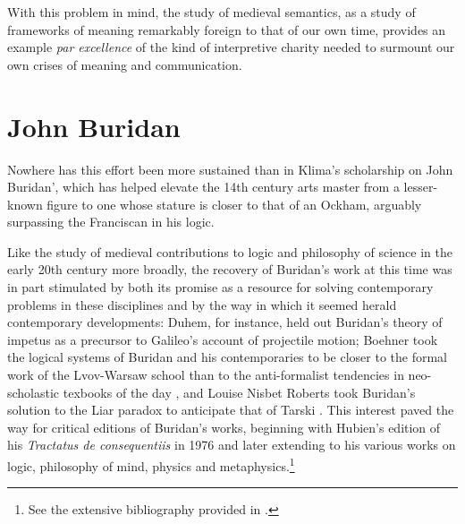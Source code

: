 \documentclass[]{article}
\begin{document}
With this problem in mind, 
the study of medieval semantics, 
as a study of frameworks of meaning remarkably foreign to that of our own time, 
provides an example \emph{par excellence} of the kind of interpretive charity needed to surmount our own crises of meaning and communication. 

\section{John Buridan}
Nowhere has this effort been more sustained than in Klima's scholarship on John Buridan', 
which has helped elevate the 14th century arts master from a lesser-known figure to one whose stature is closer to that of an Ockham, 
arguably surpassing the Franciscan in his logic.

Like the study of medieval contributions to logic and philosophy of science in the early 20th century more broadly, 
the recovery of Buridan's work at this time was in part stimulated 
by both 
its promise as a resource for solving contemporary problems in these disciplines 
and by the way in which it seemed herald contemporary developments: 
Duhem, for instance, held out Buridan's theory of impetus as a precursor to Galileo's account of projectile motion; 
Boehner took the logical systems of Buridan and his contemporaries to be closer to the formal work of the Lvov-Warsaw school 
than to the anti-formalist tendencies in neo-scholastic texbooks of the day \autocite{Boehner1952}, 
and Louise Nisbet Roberts took Buridan's solution to the Liar paradox to anticipate that of Tarski \autocite[100]{Roberts1953}. 
This interest paved the way for critical editions of Buridan's works, beginning with Hubien's edition of his \emph{Tractatus de consequentiis} in 1976 and later extending to his various works on logic, philosophy of mind, physics and metaphysics.\footnote{See the extensive bibliography provided in \autocite{sep-buridan}.}
\end{document}
